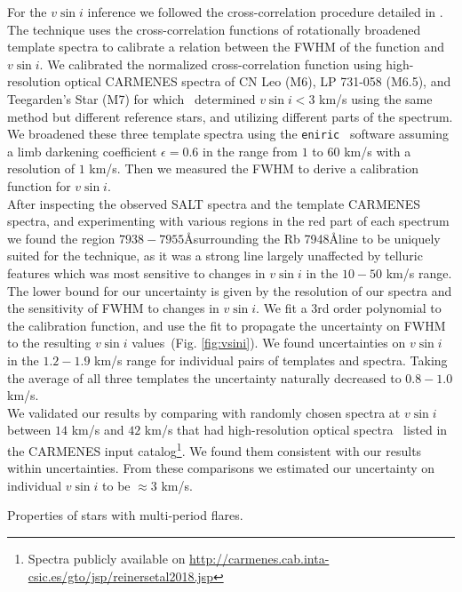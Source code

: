 \documentclass[fleqn,usenatbib,letters]{mnras}%
\begin{document}
For the $v\sin i$ inference we followed the cross-correlation procedure detailed in \citet{reiners2012}.
The technique uses the cross-correlation functions of rotationally broadened template spectra to calibrate a relation between the FWHM of the function and $v\sin i$. We calibrated the normalized cross-correlation function using high-resolution optical CARMENES spectra of CN Leo (M6), LP 731-058 (M6.5), and Teegarden's Star (M7) for which~\citet{reiners2018} determined $v\sin i < 3$ km/s using the same method but different reference stars, and utilizing different parts of the spectrum. We broadened these three template spectra using the \texttt{eniric}~\citep{neal2019} software assuming a limb darkening coefficient $\epsilon=0.6$ in the range from $1$ to $60$ km/s with a resolution of $1$ km/s. Then we measured the FWHM to derive a calibration function for $v\sin i$.
\\
After inspecting the observed SALT spectra and the template CARMENES spectra, and experimenting with various regions in the red part of each spectrum we found the region $7938-7955$\AA surrounding the Rb 7948\AA line to be uniquely suited for the technique, as it was a strong line largely unaffected by telluric features which was most sensitive to changes in $v\sin i$ in the $10-50$ km/s range. The lower bound for our uncertainty is given by the resolution of our spectra and the sensitivity of FWHM to changes in $v\sin i$. We fit a 3rd order polynomial to the calibration function, and use the fit to propagate the uncertainty on FWHM to the resulting $v\sin i$ values~(Fig. \ref{fig:vsini}). We found uncertainties on $v\sin i$ in the $1.2-1.9$ km/s range for individual pairs of templates and spectra. Taking the average of all three templates the uncertainty naturally decreased to $0.8-1.0$ km/s.
\\
We validated our results by comparing with randomly chosen spectra at $v\sin i$ between $14$ km/s and $42$ km/s that had high-resolution optical spectra~\citep{reiners2018} listed in the CARMENES input catalog\citep{jeffers2018}\footnote{Spectra publicly available on \url{http://carmenes.cab.inta-csic.es/gto/jsp/reinersetal2018.jsp}}. We found them consistent with our results within uncertainties. From these comparisons we estimated our uncertainty on individual $v\sin i$ to be $\approx 3$ km/s.


\begin{table}
\centering
\caption{Properties of stars with multi-period flares.}
\label{tab:properties}

\end{table}
\end{document}
